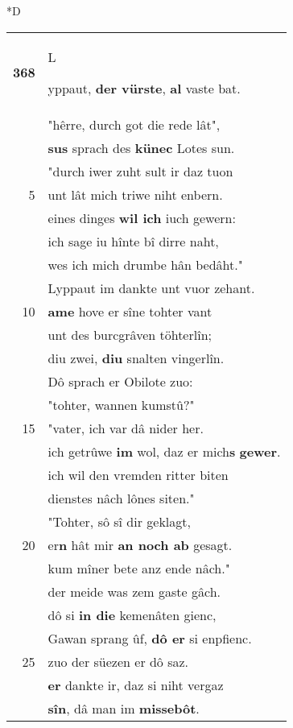 \documentclass[8pt,a4paper,notitlepage]{article}
\begin{document}
\begin{table}[ht]
\begin{minipage}[t]{0.5\linewidth}
\small
\begin{center}*D
\end{center}
\begin{tabular}{rl}
\textbf{368} & \begin{large}L\end{large}yppaut, \textbf{der vürste}, \textbf{al} vaste bat.\\ 
 & "hêrre, durch got die rede lât",\\ 
 & \textbf{sus} sprach des \textbf{künec} Lotes sun.\\ 
 & "durch iwer zuht sult ir daz tuon\\ 
5 & unt lât mich triwe niht enbern.\\ 
 & eines dinges \textbf{wil ich} iuch gewern:\\ 
 & ich sage iu hînte bî dirre naht,\\ 
 & wes ich mich drumbe hân bedâht."\\ 
 & Lyppaut im dankte unt vuor zehant.\\ 
10 & \textbf{ame} hove er sîne tohter vant\\ 
 & unt des burcgrâven töhterlîn;\\ 
 & diu zwei, \textbf{diu} snalten vingerlîn.\\ 
 & Dô sprach er Obilote zuo:\\ 
 & "tohter, wannen kumstû?"\\ 
15 & "vater, ich var dâ nider her.\\ 
 & ich getrûwe \textbf{im} wol, daz er mich\textbf{s} \textbf{gewer}.\\ 
 & ich wil den vremden ritter biten\\ 
 & dienstes nâch lônes siten."\\ 
 & "Tohter, sô sî dir geklagt,\\ 
20 & er\textbf{n} hât mir \textbf{an noch ab} gesagt.\\ 
 & kum mîner bete anz ende nâch."\\ 
 & der meide was zem gaste gâch.\\ 
 & dô si \textbf{in die} kemenâten gienc,\\ 
 & Gawan sprang ûf, \textbf{dô er} si enpfienc.\\ 
25 & zuo der süezen er dô saz.\\ 
 & \textbf{er} dankte ir, daz si niht vergaz\\ 
 & \textbf{sîn}, dâ man im \textbf{missebôt}.\\ 

\end{tabular}
\end{minipage}
\end{table}
\end{document}
